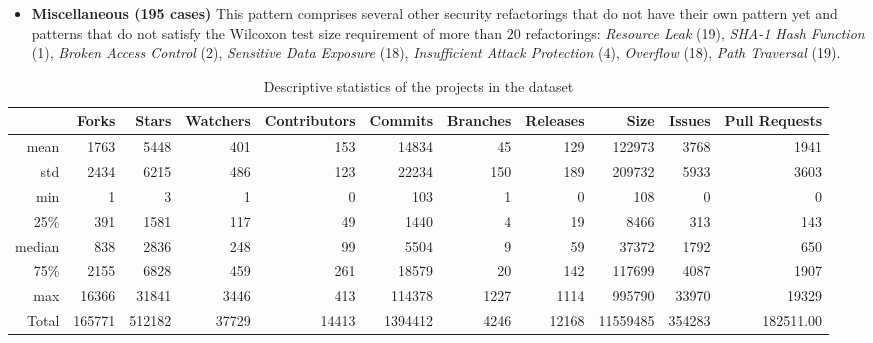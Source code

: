 \documentclass[10pt,conference]{IEEEtran}
\begin{document}
\begin{itemize}
    \item \textbf{Miscellaneous (195 cases)} This pattern comprises
	several other security refactorings that do not have their own pattern yet and patterns that
	do not satisfy the Wilcoxon test size requirement of more than $20$ refactorings:
    \textit{Resource Leak} (19), \textit{SHA-1 Hash Function} (1),
    \textit{Broken Access Control} (2), \textit{Sensitive Data Exposure} (18),
    \textit{Insufficient Attack Protection} (4), \textit{Overflow} (18),
    \textit{Path Traversal} (19). \end{itemize}

\begin{table}[h]
	\centering
	\caption{Descriptive statistics of the projects in the dataset}
\begin{tabular}{@{}rrrrrrrrrrr@{}}
\toprule
      & Forks   & Stars   & Watchers & Contributors & Commits  & Branches & Releases & Size      & Issues & Pull Requests  \\ \midrule
mean  & 1763 & 5448 & 401   & 153       & 14834 & 45    & 129   & 122973 & 3768   & 1941 \\
std   & 2434 & 6215 & 486   & 123       & 22234 & 150   & 189   & 209732 & 5933   & 3603 \\
min   & 1       & 3       & 1        & 0            & 103      & 1        & 0        & 108       & 0         & 0       \\
25\%  & 391  & 1581    & 117   & 49           & 1440  & 4        & 19       & 8466   & 313    & 143  \\
median  & 838  & 2836 & 248      & 99           & 5504  & 9        & 59       & 37372  & 1792   & 650     \\
75\%  & 2155    & 6828 & 459   & 261          & 18579 & 20       & 142   & 117699 & 4087   & 1907 \\
max   & 16366   & 31841   & 3446     & 413          & 114378   & 1227     & 1114     & 995790    & 33970     & 19329   \\
Total & 165771  & 512182  & 37729    & 14413        & 1394412  & 4246     & 12168    & 11559485  & 354283    & 182511.00  \\ \bottomrule
\end{tabular}
\label{tab:dataset}
\end{table}
\end{document}
